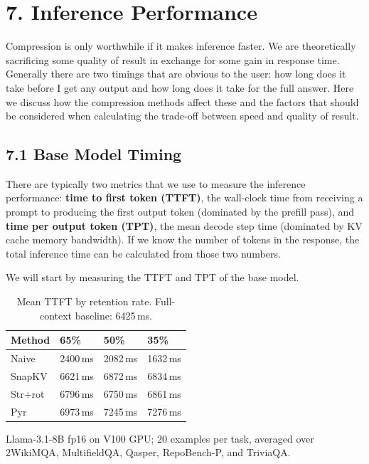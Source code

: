 \documentclass[10pt,letterpaper]{article}
\begin{document}
\hypertarget{inference-performance}{%
\section{7. Inference Performance}\label{inference-performance}}

Compression is only worthwhile if it makes inference faster. We are theoretically sacrificing 
some quality of result in exchange for some gain in response time.  Generally there are two 
timings that are obvious to the user: how long does it take before I get any output and
how long does it take for the full answer.  Here we discuss how the compression methods
affect these and the factors that should be considered when calculating the trade-off between
speed and quality of result.

\subsection{7.1 Base Model Timing}\label{base-model-timing} 

There are typically two metrics that we use to measure the inference performance: 
\textbf{time to first token (TTFT)}, the wall-clock time from receiving a prompt to producing 
the first output token (dominated by the prefill pass), and \textbf{time per output token 
(TPT)}, the mean decode step time (dominated by KV cache memory bandwidth).
If we know the number of tokens in the response, the total inference
time can be calculated from those two numbers.

We will start by measuring the TTFT and TPT of the base model. 

\begin{table}[H]
\centering
\small
\caption{Mean TTFT by retention rate. Full-context baseline: 6425\,ms.}
\label{tab:ttft}
\begin{tabular}{@{}llll@{}}
\toprule
Method & 65\% & 50\% & 35\%\\
\midrule
Naive     & 2400\,ms & 2082\,ms & 1632\,ms\\
SnapKV    & 6621\,ms & 6872\,ms & 6834\,ms\\
Str+rot   & 6796\,ms & 6750\,ms & 6861\,ms\\
Pyr       & 6973\,ms & 7245\,ms & 7276\,ms\\
\bottomrule
\end{tabular}
\center
Llama-3.1-8B fp16 on V100 GPU; 20 examples per task, averaged over\\2WikiMQA, MultifieldQA, Qasper, RepoBench-P, and TriviaQA.
\end{table}
\end{document}
